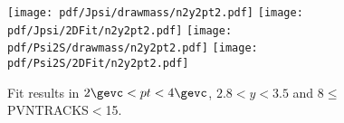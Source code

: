 \begin{figure}[H]
\begin{center}
\texttt{[image: pdf/Jpsi/drawmass/n2y2pt2.pdf]}
\texttt{[image: pdf/Jpsi/2DFit/n2y2pt2.pdf]}
\vspace*{-0.5cm}
\texttt{[image: pdf/Psi2S/drawmass/n2y2pt2.pdf]}
\texttt{[image: pdf/Psi2S/2DFit/n2y2pt2.pdf]}
\vspace*{-0.5cm}
\end{center}
\caption{Fit results in $2\gevc<pt<4\gevc$, $2.8<y<3.5$ and 8$\leq$PVNTRACKS$<$15.}
\label{Fitn2y2pt2}
\end{figure}
